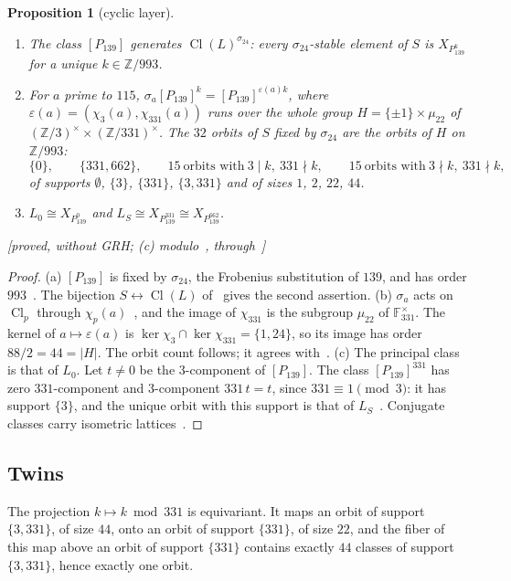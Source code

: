 \documentclass[11pt,a4paper]{amsart}
\theoremstyle{plain}
\newtheorem{proposition}{Proposition}[section]
\theoremstyle{definition}
\newcommand{\Z}{\mathbb{Z}}
\newcommand{\F}{\mathbb{F}}
\DeclareMathOperator{\Cl}{Cl}
\newcommand{\Lz}{L_{0}}
\newcommand{\LS}{L_{S}}
\newcommand{\st}[1]{\textup{\textsf{\small[#1]}}}
\begin{document}
\begin{proposition}[cyclic layer]\label{prop:cyclic}
\begin{enumerate}[label=\textup{(\alph*)}]
\item The class $[P_{139}]$ generates $\Cl(L)^{\sigma_{24}}$: every $\sigma_{24}$-stable element of $S$ is $X_{P_{139}^k}$ for a unique $k\in\Z/993$.
\item For $a$ prime to $115$, $\sigma_a[P_{139}]^k=[P_{139}]^{\varepsilon(a)k}$, where $\varepsilon(a)=(\chi_3(a),\chi_{331}(a))$ runs over the whole group $H=\{\pm1\}\times\mu_{22}$ of $(\Z/3)^\times\times(\Z/331)^\times$. The $32$ orbits of $S$ fixed by $\sigma_{24}$ are the orbits of $H$ on $\Z/993$:
\[
\{0\},\qquad\{331,662\},\qquad 15\ \text{orbits with}\ 3\mid k,\ 331\nmid k,\qquad 15\ \text{orbits with}\ 3\nmid k,\ 331\nmid k,
\]
of supports $\emptyset$, $\{3\}$, $\{331\}$, $\{3,331\}$ and of sizes $1$, $2$, $22$, $44$.
\item $\Lz\cong X_{P_{139}^{0}}$ and $\LS\cong X_{P_{139}^{331}}\cong X_{P_{139}^{662}}$.
\end{enumerate}
\st{proved, without GRH; (c) modulo~\cite[Rem.~3.11, Lemma~A.9]{Sak26}, through~\cite[Prop.~2.7]{Gau26}}
\end{proposition}

\begin{proof}
(a) $[P_{139}]$ is fixed by $\sigma_{24}$, the Frobenius substitution of $139$, and has order $993$~\cite[Rem.~6.8(a)]{Gau26}. The bijection $S\leftrightarrow\Cl(L)$ of~\cite[Prop.~2.3]{Gau26} gives the second assertion.
(b) $\sigma_a$ acts on $\Cl_p$ through $\chi_p(a)$~\cite[Prop.~2.5]{Gau26}, and the image of $\chi_{331}$ is the subgroup $\mu_{22}$ of $\F_{331}^\times$. The kernel of $a\mapsto\varepsilon(a)$ is $\ker\chi_3\cap\ker\chi_{331}=\{1,24\}$, so its image has order $88/2=44=|H|$. The orbit count follows; it agrees with~\cite[Table~1]{Gau26}.
(c) The principal class is that of $\Lz$. Let $t\ne0$ be the $3$-component of $[P_{139}]$. The class $[P_{139}]^{331}$ has zero $331$-component and $3$-component $331\,t=t$, since $331\equiv1\pmod3$: it has support $\{3\}$, and the unique orbit with this support is that of $\LS$~\cite[Prop.~2.7(b)]{Gau26}. Conjugate classes carry isometric lattices~\cite[\S2.1]{Gau26}.
\end{proof}

\subsection{Twins}
The projection $k\mapsto k\bmod331$ is equivariant. It maps an orbit of support $\{3,331\}$, of size $44$, onto an orbit of support $\{331\}$, of size $22$, and the fiber of this map above an orbit of support $\{331\}$ contains exactly $44$ classes of support $\{3,331\}$, hence exactly one orbit.
\end{document}
